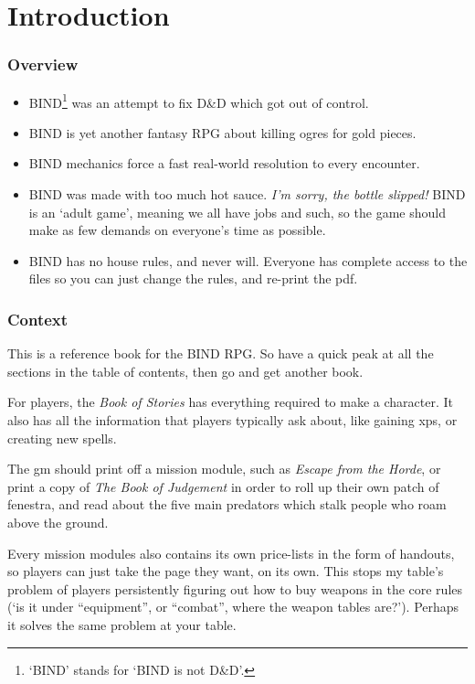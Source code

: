 \chapter*{Introduction}

\begin{multicols}{2}

\subsection*{Overview}

\begin{itemize}
  \item
  BIND\footnote{`BIND' stands for `BIND is not D\&D'.} was an attempt to fix D\&D which got out of control.
  \item
  BIND is yet another fantasy RPG about killing ogres for gold pieces.
  \item
  BIND mechanics force a fast real-world resolution to every encounter.
  \item
  \ifnum{}
    BIND was made with too much hot sauce.
    \emph{I'm sorry, the bottle slipped!}
  \else
  BIND is an `adult game', meaning we all have jobs and such, so the game should make as few demands on everyone's time as possible.
  \fi
  \item
  BIND has no house rules, and never will.
  Everyone has complete access to the files so you can just change the rules, and re-print the \gls{pdf}.
\end{itemize}

\subsection*{Context}

This is a reference book for the BIND RPG.
So have a quick peak at all the sections in the table of contents, then go and get another book.

For players, the \textit{Book of Stories} has everything required to make a character.
It also has all the information that players typically ask about, like gaining \glspl{xp}, or creating new spells.

The \gls{gm} should print off a mission module, such as \textit{Escape from the Horde}, or print a copy of \textit{The Book of Judgement} in order to roll up their own patch of \gls{fenestra}, and read about the five main predators which stalk people who roam above the ground.

Every mission modules also contains its own price-lists in the form of handouts, so players can just take the page they want, on its own.
This stops my table's problem of players persistently figuring out how to buy weapons in the core rules (`is it under ``equipment'', or ``combat'', where the weapon tables are?').
Perhaps it solves the same problem at your table.


\end{multicols}
